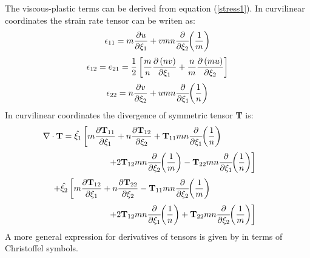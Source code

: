 The viscous-plastic terms can be derived from equation
(\ref{stress1}).  In curvilinear coordinates the strain rate tensor
can be writen as:
\begin{equation}
   \epsilon_{11} = m {\partial u \over \partial \xi_1} +
    vmn {\partial \over \partial \xi_2} \!\! \left( {1 \over m} \right)
\end{equation}
\begin{equation}
   \epsilon_{12} = e_{21} = {1 \over 2} \left[
   {m \over n} {\partial \left( nv \right) \over \partial \xi_1}
   + {n \over m} {\partial \left( mu \right) \over \partial \xi_2}
   \right]
\end{equation}
\begin{equation}
   \epsilon_{22} = n {\partial v \over \partial \xi_2} +
    umn {\partial \over \partial \xi_1} \!\! \left( {1 \over n} \right)
\end{equation}
In curvilinear coordinates the divergence of symmetric tensor {\bf T}
is:
\[
    \nabla \cdot \mbox{\bf T} =
    \hat{\xi_1} \left[ m
    {\partial \mbox{\bf T}_{11} \over \partial \xi_1}
    + n {\partial \mbox{\bf T}_{12} \over \partial \xi_2}
    + \mbox{\bf T}_{11} mn {\partial \over \partial \xi_1} \!\!
    \left( {1 \over n} \right) \right. \mbox{\hspace{2 cm}}
\]
\[
    \mbox{\hspace{2 cm}} \left. + 2 \mbox{\bf T}_{12} mn
    {\partial \over \partial \xi_2} \!\! \left( {1 \over m} \right)
    - \mbox{\bf T}_{22} mn
    {\partial \over \partial \xi_1} \!\! \left( {1 \over n} \right)
    \right]
\]
\[
    + \hat{\xi_2} \left[ m
    {\partial \mbox{\bf T}_{12} \over \partial \xi_1}
    + n {\partial \mbox{\bf T}_{22} \over \partial \xi_2}
    - \mbox{\bf T}_{11} mn {\partial \over \partial \xi_2} \!\!
    \left( {1 \over m} \right) \right. \mbox{\hspace{2 cm}}
\]
\begin{equation}
    \mbox{\hspace{2 cm}} \left. + 2 \mbox{\bf T}_{12} mn
    {\partial \over \partial \xi_1} \!\! \left( {1 \over n} \right)
    + \mbox{\bf T}_{22} mn
    {\partial \over \partial \xi_2} \!\! \left( {1 \over m} \right)
    \right]
\end{equation}
A more general expression for derivatives of tensors is given by
\citet{Aris} in terms of Christoffel symbols.

